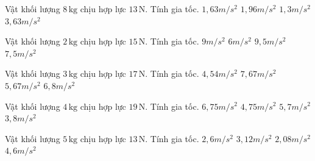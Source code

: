 \begin{ex}
Vật khối lượng $8\,\text{kg}$ chịu hợp lực $13\,\text{N}$. Tính gia tốc.
\choice
{\True $1,63 m/s^2$}
{$1,96 m/s^2$}
{$1,3 m/s^2$}
{$3,63 m/s^2$}
\end{ex}

\begin{ex}
Vật khối lượng $2\,\text{kg}$ chịu hợp lực $15\,\text{N}$. Tính gia tốc.
\choice
{$9 m/s^2$}
{$6 m/s^2$}
{$9,5 m/s^2$}
{\True $7,5 m/s^2$}
\end{ex}

\begin{ex}
Vật khối lượng $3\,\text{kg}$ chịu hợp lực $17\,\text{N}$. Tính gia tốc.
\choice
{$4,54 m/s^2$}
{$7,67 m/s^2$}
{\True $5,67 m/s^2$}
{$6,8 m/s^2$}
\end{ex}

\begin{ex}
Vật khối lượng $4\,\text{kg}$ chịu hợp lực $19\,\text{N}$. Tính gia tốc.
\choice
{$6,75 m/s^2$}
{\True $4,75 m/s^2$}
{$5,7 m/s^2$}
{$3,8 m/s^2$}
\end{ex}

\begin{ex}
Vật khối lượng $5\,\text{kg}$ chịu hợp lực $13\,\text{N}$. Tính gia tốc.
\choice
{\True $2,6 m/s^2$}
{$3,12 m/s^2$}
{$2,08 m/s^2$}
{$4,6 m/s^2$}
\end{ex}

